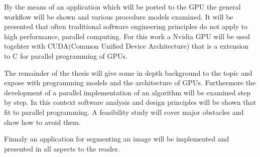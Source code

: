 By the means of an application which will be ported to the \gls{GPU} the general
workflow will be shown and various procedure models examined. It will be
presented that often traditional software engineering principles do not
apply to high performance, parallel computing. For this work a Nvidia \gls{GPU} will
be used togehter with \gls{CUDA}(Common Unified Device Architecture) that is a
extension to C for parallel programming of GPUs. 

The remainder of the thesis will give some in depth background to the topic and
expose with programming models and the architecture of GPUs. Furthermore the
development of a parallel implementation of an algorithm will be examined step
by step. In this context software analysis and design principles will be shown
that fit to parallel programming. A feasibility study will cover major obstacles
and show how to avoid them.

Finnaly an application for segmenting an image will be implemented and presented
in all aspects to the reader.
